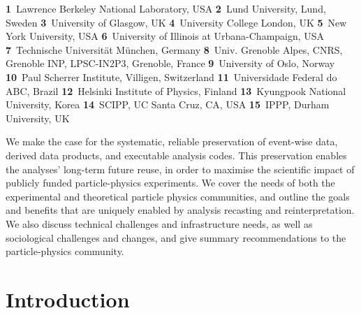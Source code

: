 \documentclass[11pt]{article}
\begin{document}
\begin{center}
\textbf{1}~Lawrence Berkeley National Laboratory, USA
\textbf{2}~Lund University, Lund, Sweden
\textbf{3}~University of Glasgow, UK
\textbf{4}~University College London, UK
\textbf{5}~New York University, USA
\textbf{6}~University of Illinois at Urbana-Champaign, USA
\textbf{7}~Technische Universität München, Germany
\textbf{8}~Univ. Grenoble Alpes, CNRS, Grenoble INP, LPSC-IN2P3, Grenoble, France
\textbf{9}~University of Oslo, Norway
\textbf{10}~Paul Scherrer Institute, Villigen, Switzerland
\textbf{11}~Universidade Federal do ABC, Brazil
\textbf{12}~Helsinki Institute of Physics, Finland
\textbf{13}~Kyungpook National University, Korea
\textbf{14}~SCIPP, UC Santa Cruz, CA, USA
\textbf{15}~IPPP, Durham University, UK
\end{center}


\begin{Abstract}
\noindent We make the case for the systematic, reliable preservation of event-wise data, derived data products, and executable analysis codes. This preservation enables the analyses' long-term future reuse, in order to maximise the scientific impact of publicly funded particle-physics experiments.
We cover the needs of both the experimental and theoretical particle physics communities, and outline the goals and benefits that are uniquely enabled by analysis recasting and reinterpretation. 
We also discuss technical challenges and infrastructure needs, as well as sociological challenges and changes, and give summary recommendations to the particle-physics community.
\end{Abstract}

\clearpage%
%
\tableofcontents
\clearpage
\section{Introduction}
\end{document}
